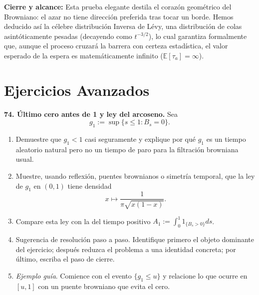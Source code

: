 \documentclass[11pt, letterpaper]{article}
\begin{document}
\begin{solucion}
    \textbf{Cierre y alcance:}
    Esta prueba elegante destila el corazón geométrico del Browniano: el azar no tiene dirección preferida tras tocar un borde. Hemos deducido así la célebre distribución Inversa de Lévy, una distribución de colas asintóticamente pesadas (decayendo como $t^{-3/2}$), lo cual garantiza formalmente que, aunque el proceso cruzará la barrera con certeza estadística, el valor esperado de la espera es matemáticamente infinito ($\mathbb{E}[\tau_a] = \infty$).
\end{solucion}

\newpage
\section{Ejercicios Avanzados}

\begin{ejercicio}
    \textbf{74. Último cero antes de 1 y ley del arcoseno.} Sea
    \[ g_{1} := \sup\{s\le 1 : B_{s}=0\}. \]
    \begin{enumerate}
        \item Demuestre que $g_{1}<1$ casi seguramente y explique por qué $g_{1}$ es un tiempo aleatorio natural pero no un tiempo de paro para la filtración browniana usual.
        \item Muestre, usando reflexión, puentes brownianos o simetría temporal, que la ley de $g_{1}$ en $(0, 1)$ tiene densidad
        \[ x\mapsto \frac{1}{\pi\sqrt{x(1-x)}}. \]
        \item Compare esta ley con la del tiempo positivo $A_1 := \int_0^1 1_{\{B_s>0\}} ds$.
        \item Sugerencia de resolución paso a paso. Identifique primero el objeto dominante del ejercicio; después reduzca el problema a una identidad concreta; por último, escriba el paso de cierre.
        \item \textit{Ejemplo guía}. Comience con el evento $\{g_{1} \le u\}$ y relacione lo que ocurre en $[u, 1]$ con un puente browniano que evita el cero.
    \end{enumerate}
\end{ejercicio}

\vspace{5mm}
\end{document}
